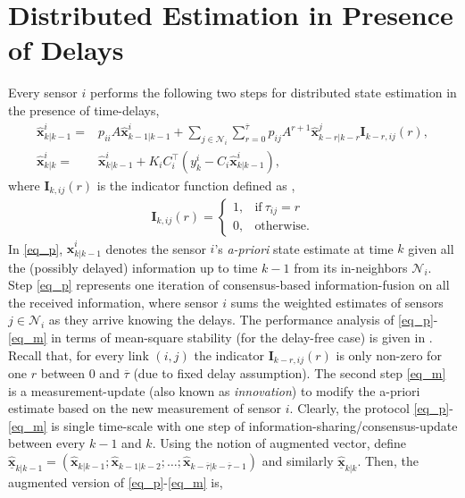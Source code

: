 \documentclass[journal]{IEEEtran}
\newcommand{\tb}{\color{blue}}
\def\mb{\mathbf}
\def\mc{\mathcal}
\begin{document}
\section{Distributed Estimation in Presence of Delays} \label{sec_pro}
Every sensor $i$ performs the following two steps for distributed state estimation in the presence of time-delays, 
\small
\begin{align}\label{eq_p} 
	\widehat{\mb{x}}^i_{k|k-1} =& p_{ii}A\widehat{\mb{x}}^i_{k-1|k-1} + \sum_{j\in\mathcal{N}_i} \sum_{r=0}^{\overline{\tau}} p_{ij}A^{r+1}\widehat{\mb{x}}^j_{k-r|k-r} \mb{I}_{k-r,ij}(r),
	\\\label{eq_m}
	\widehat{\mb{x}}^i_{k|k} =& \widehat{\mb{x}}^i_{k|k-1} + K_i C_i^\top \left({y}^i_k-C_i\widehat{\mb{x}}^i_{k|k-1}\right),
\end{align} \normalsize
where  $\mb{I}_{k,ij}(r)$ is the indicator function  defined as \cite{Themis_delay},
\begin{align}
	\mb{I}_{k,ij}(r) = \left\{
	\begin{array}{ll}
		1, & \text{if}~ \tau_{ij}=r  \\
		0, & \text{otherwise}.
	\end{array}\right.
\end{align}
In \eqref{eq_p}, $\widehat{\mb{x}}^i_{k|k-1}$ denotes the sensor $i$'s \textit{a-priori} state estimate at time $k$ given all the (possibly delayed) information up to time $k-1$ from its in-neighbors $\mathcal{N}_i$. Step \eqref{eq_p} represents one iteration of consensus-based information-fusion on all the received information, where sensor $i$ sums the weighted estimates
of sensors $j\in \mc{N}_i$ as they arrive  knowing the delays. The performance analysis of \eqref{eq_p}-\eqref{eq_m} in terms of mean-square stability (for the delay-free case) is given in \cite{jstsp}. Recall that, for every link $(i,j)$ the indicator $\mb{I}_{k-r,ij}(r)$ is only non-zero for one $r$ between $0$ and $\overline{\tau}$ (due to fixed delay assumption). The second step \eqref{eq_m} is a measurement-update (also known as \textit{innovation}) to modify the a-priori estimate based on the new measurement of sensor $i$. Clearly, the  protocol \eqref{eq_p}-\eqref{eq_m} is single time-scale with one step of information-sharing/consensus-update between every $k-1$ and $k$. 
Using the notion of augmented vector, define $\underline{\widehat{\mb{x}}}_{k|k-1} = \left(\widehat{\mb{x}}_{k|k-1}; \widehat{\mb{x}}_{k-1|k-2}; \dots; \widehat{\mb{x}}_{k-\overline{\tau}|k-\overline{\tau}-1} \right)$ and similarly $\underline{\widehat{\mb{x}}}_{k|k}$. Then, the augmented version of \eqref{eq_p}-\eqref{eq_m} is,
\end{document}
